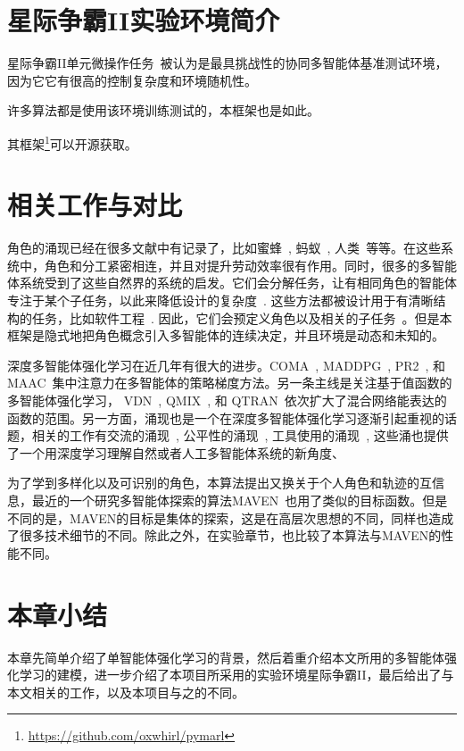 \section{星际争霸II实验环境简介}
星际争霸II单元微操作任务~\cite{samvelyan2019starcraft}被认为是最具挑战性的协同多智能体基准测试环境，因为它它有很高的控制复杂度和环境随机性。

许多算法\cite{foerster2017stabilising, foerster2018counterfactual, rashid2018qmix, mahajan2019maven}都是使用该环境训练测试的，本框架也是如此。

其框架\footnote{\url{https://github.com/oxwhirl/pymarl}}可以开源获取。


\section{相关工作与对比}
角色的涌现已经在很多文献中有记录了，比如蜜蜂~\cite{jeanson2005emergence}, 蚂蚁~\cite{gordon1996organization}, 人类~\cite{butler2012condensed}等等。在这些系统中，角色和分工紧密相连，并且对提升劳动效率很有作用。同时，很多的多智能体系统受到了这些自然界的系统的启发。它们会分解任务，让有相同角色的智能体专注于某个子任务，以此来降低设计的复杂度~\cite{wooldridge2000gaia, omicini2000soda, padgham2002prometheus, pavon2003agent, cossentino2005passi, zhu2008role, spanoudakis2010using, deloach2010mase, bonjean2014adelfe}. 这些方法都被设计用于有清晰结构的任务，比如软件工程~\cite{bresciani2004tropos}. 因此，它们会预定义角色以及相关的子任务~\cite{ Lhaksmana2018role}。但是本框架是隐式地把角色概念引入多智能体的连续决定，并且环境是动态和未知的。

深度多智能体强化学习在近几年有很大的进步。COMA~\citep{foerster2018counterfactual}, MADDPG~\citep{lowe2017multi}, PR2~\citep{wen2019probabilistic}, 和MAAC~\cite{iqbal2019actor}集中注意力在多智能体的策略梯度方法。另一条主线是关注基于值函数的多智能体强化学习， VDN~\citep{sunehag2018value}, QMIX~\citep{rashid2018qmix}, 和 QTRAN~\citep{son2019qtran}依次扩大了混合网络能表达的函数的范围。另一方面，涌现也是一个在深度多智能体强化学习逐渐引起重视的话题，相关的工作有交流的涌现~\cite{foerster2016learning, lazaridou2017multi, das2017learning, mordatch2018emergence}, 公平性的涌现~\cite{jiang2019learning}, 工具使用的涌现~\cite{baker2020emergent}, 这些涌也提供了一个用深度学习理解自然或者人工多智能体系统的新角度、

为了学到多样化以及可识别的角色，本算法提出又换关于个人角色和轨迹的互信息，最近的一个研究多智能体探索的算法MAVEN~\cite{mahajan2019maven}也用了类似的目标函数。但是不同的是，MAVEN的目标是集体的探索，这是在高层次思想的不同，同样也造成了很多技术细节的不同。除此之外，在实验章节，也比较了本算法与MAVEN的性能不同。

\section{本章小结}
本章先简单介绍了单智能体强化学习的背景，然后着重介绍本文所用的多智能体强化学习的建模，进一步介绍了本项目所采用的实验环境星际争霸II，最后给出了与本文相关的工作，以及本项目与之的不同。
